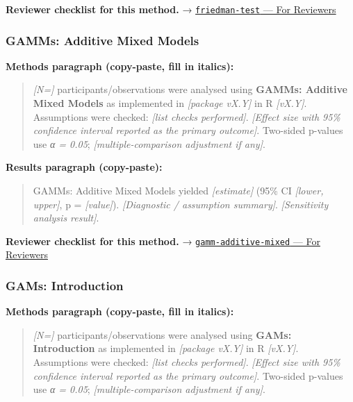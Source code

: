 \documentclass[
]{article}
\begin{document}
\textbf{Reviewer checklist for this method.} →
\href{../chapters/04-inferential/friedman-test.Rmd\#for-reviewers}{\texttt{friedman-test}
--- For Reviewers}

\subsubsection{GAMMs: Additive Mixed
Models}\label{gamms-additive-mixed-models}

\textbf{Methods paragraph (copy-paste, fill in italics):}

\begin{quote}
\emph{{[}N={]}} participants/observations were analysed using
\textbf{GAMMs: Additive Mixed Models} as implemented in \emph{{[}package
vX.Y{]}} in R \emph{{[}vX.Y{]}}. Assumptions were checked: \emph{{[}list
checks performed{]}}. \emph{{[}Effect size with 95\% confidence interval
reported as the primary outcome{]}}. Two-sided p-values use \emph{α =
0.05}; \emph{{[}multiple-comparison adjustment if any{]}}.
\end{quote}

\textbf{Results paragraph (copy-paste):}

\begin{quote}
GAMMs: Additive Mixed Models yielded \emph{{[}estimate{]}} (95\% CI
\emph{{[}lower, upper{]}}, p = \emph{{[}value{]}}). \emph{{[}Diagnostic
/ assumption summary{]}}. \emph{{[}Sensitivity analysis result{]}}.
\end{quote}

\textbf{Reviewer checklist for this method.} →
\href{../chapters/07-regression/gamm-additive-mixed.Rmd\#for-reviewers}{\texttt{gamm-additive-mixed}
--- For Reviewers}

\subsubsection{GAMs: Introduction}\label{gams-introduction}

\textbf{Methods paragraph (copy-paste, fill in italics):}

\begin{quote}
\emph{{[}N={]}} participants/observations were analysed using
\textbf{GAMs: Introduction} as implemented in \emph{{[}package vX.Y{]}}
in R \emph{{[}vX.Y{]}}. Assumptions were checked: \emph{{[}list checks
performed{]}}. \emph{{[}Effect size with 95\% confidence interval
reported as the primary outcome{]}}. Two-sided p-values use \emph{α =
0.05}; \emph{{[}multiple-comparison adjustment if any{]}}.
\end{quote}
\end{document}
